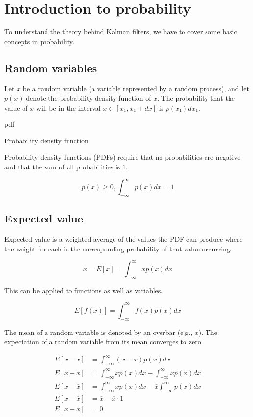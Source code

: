 \section{Introduction to probability}

To understand the theory behind Kalman filters, we have to cover some basic
concepts in probability.

\subsection{Random variables}

Let $x$ be a random variable (a variable represented by a random process), and
let $p(x)$ denote the probability density function of $x$. The probability that
the value of $x$ will be in the interval $x \in [x_1, x_1 + dx]$ is
$p(x_1) dx_1$.

\begin{svg}{pdf}
  \caption{Probability density function}
\end{svg}

Probability density functions (PDFs) require that no probabilities are negative
and that the sum of all probabilities is $1$.

\begin{equation*}
  p(x) \geq 0, \int_{-\infty}^\infty p(x) dx = 1
\end{equation*}

\subsection{Expected value}

Expected value is a weighted average of the values the PDF can produce where the
weight for each is the corresponding probability of that value occurring.

\begin{equation*}
  \overline{x} = E[x] = \int_{-\infty}^\infty x p(x) dx
\end{equation*}

This can be applied to functions as well as variables.

\begin{equation*}
  E[f(x)] = \int_{-\infty}^\infty f(x) p(x) dx
\end{equation*}

The mean of a random variable is denoted by an overbar (e.g., $\overline{x}$).
The expectation of a random variable from its mean converges to zero.

\begin{align*}
  E[x - \overline{x}] &= \int_{-\infty}^\infty (x - \overline{x}) p(x) dx \\
  E[x - \overline{x}] &= \int_{-\infty}^\infty x p(x) dx -
    \int_{-\infty}^\infty \overline{x} p(x) dx \\
  E[x - \overline{x}] &= \int_{-\infty}^\infty x p(x) dx -
    \overline{x} \int_{-\infty}^\infty p(x) dx \\
  E[x - \overline{x}] &= \overline{x} - \overline{x} \cdot 1 \\
  E[x - \overline{x}] &= 0 \\
\end{align*}

